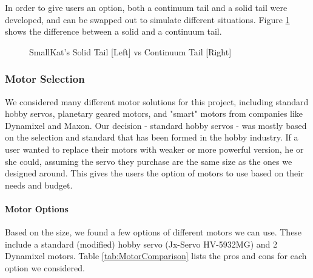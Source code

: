                 In order to give users an option, both a continuum tail and a solid tail were developed, and can be swapped out to simulate different situations. Figure \ref{fig:TailComparison} shows the difference between a solid and a continuum tail.
                
                \begin{figure}[H]
                    \centering

                    \caption{SmallKat's Solid Tail [Left] vs Continuum Tail [Right]}
                    \label{fig:TailComparison}
                \end{figure}

        \subsubsection{Motor Selection}\label{subsubsec:MotorSelection}
        We considered many different motor solutions for this project, including standard hobby servos, planetary geared motors, and "smart" motors from companies like Dynamixel and Maxon. Our decision - standard hobby servos - was mostly based on the selection and standard that has been formed in the hobby industry. If a user wanted to replace their motors with weaker or more powerful version, he or she could, assuming the servo they purchase are the same size as the ones we designed around. This gives the users the option of motors to use based on their needs and budget.
            \paragraph{Motor Options}
            Based on the size, we found a few options of different motors we can use. These include a standard (modified) hobby servo (Jx-Servo HV-5932MG) and 2 Dynamixel motors. Table \ref{tab:MotorComparison} lists the pros and cons for each option we considered.

